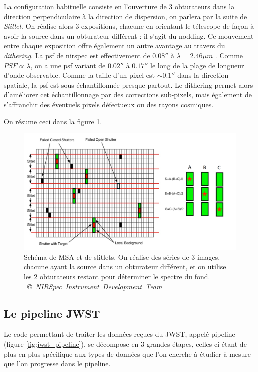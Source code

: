 \documentclass[11pt, a4paper]{article}
\newcommand{\customcite}[2]{\mbox{
  {\small \copyright} \textit{#1} \cite{#2}}
}
\begin{document}
La configuration habituelle consiste en l'ouverture de 3 obturateurs dans la direction perpendiculaire à la direction de dispersion, on parlera par la suite de \textit{Slitlet}. On réalise alors 3 expositions, chacune en orientant le télescope de façon à avoir la source dans un obturateur différent : il s'agit du nodding. Ce mouvement entre chaque exposition offre également un autre avantage au travers du \textit{dithering}. La \gls{psf} de \gls{nirspec} est effectivement de $0.08 ''$ à $\lambda = 2.46 \mu m$ \cite{10_1051_0004_6361_202142663}. 
Comme $PSF \propto \lambda$, on a une \gls{psf} variant de $0.02 ''$ à $0.17''$ le long de la plage de longueur d'onde observable. Comme la taille d'un pixel est $\sim 0.1''$ dans la direction spatiale, la \gls{psf} est sous échantillonnée presque partout. Le dithering permet alors d'améliorer cet échantillonnage par des corrections sub-pixels, mais également de s'affranchir des éventuels pixels défectueux ou des rayons cosmiques.

On résume ceci dans la figure \ref{fig:msa_slitlet}.


\begin{figure}[H]
  \centering
  \includegraphics[scale=0.2]{assets/MSA_sky_strategy.png}
  \caption{Schéma de MSA et de slitlets. On réalise des séries de 3 images, chacune ayant la source dans un obturateur différent, et on utilise les 2 obturateurs restant pour déterminer le spectre du fond. \customcite{NIRSpec Instrument Development Team}{mos}}
  \label{fig:msa_slitlet}
\end{figure}

\subsection{Le pipeline JWST}

Le code permettant de traiter les données reçues du JWST, appelé pipeline (figure \ref{fig:jwst_pipeline}), se décompose en 3 grandes étapes, celles ci étant de plus en plus spécifique aux types de données que l'on cherche à étudier à mesure que l'on progresse dans le pipeline.
\end{document}
